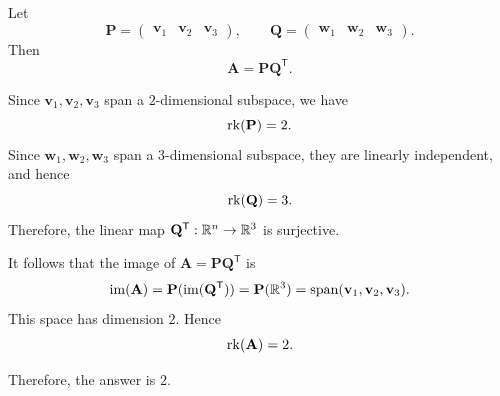    \begin{solution}
        Let
        \[
            \mathbf{P}
            =
            \begin{pmatrix}
                \mathbf{v}_1 & \mathbf{v}_2 & \mathbf{v}_3
            \end{pmatrix},
            \qquad
            \mathbf{Q}
            =
            \begin{pmatrix}
                \mathbf{w}_1 & \mathbf{w}_2 & \mathbf{w}_3
            \end{pmatrix}.
        \]
        Then
        \[
            \mathbf{A}
            =
            \mathbf{P}\mathbf{Q}^{\mathsf T}.
        \]

        Since $\mathbf{v}_1,\mathbf{v}_2,\mathbf{v}_3$ span a $2$-dimensional subspace, we have
        \[
            \operatorname{rk}(\mathbf{P})=2.
        \]
        Since $\mathbf{w}_1,\mathbf{w}_2,\mathbf{w}_3$ span a $3$-dimensional subspace, they are
        linearly independent, and hence
        \[
            \operatorname{rk}(\mathbf{Q})=3.
        \]
        Therefore, the linear map $\mathbf{Q}^{\mathsf T}:\mathbb{R}^n\to\mathbb{R}^3$ is surjective.

        It follows that the image of $\mathbf{A}=\mathbf{P}\mathbf{Q}^{\mathsf T}$ is
        \[
            \operatorname{im}(\mathbf{A})
            =
            \mathbf{P}(\operatorname{im}(\mathbf{Q}^{\mathsf T}))
            =
            \mathbf{P}(\mathbb{R}^3)
            =
            \operatorname{span}(\mathbf{v}_1,\mathbf{v}_2,\mathbf{v}_3).
        \]
        This space has dimension $2$. Hence
        \[
            \operatorname{rk}(\mathbf{A})=2.
        \]

        Therefore, the answer is $\boxed{2}$.
    \end{solution}

